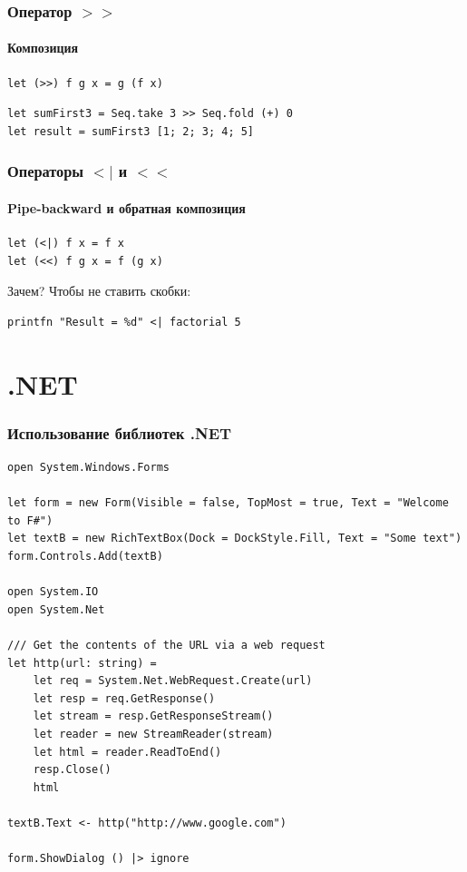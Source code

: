 \documentclass[xetex,mathserif,serif]{beamer}
\begin{document}
	\begin{frame}[fragile]
		\frametitle{Оператор $>>$}
		\framesubtitle{Композиция}
		\begin{verbatim}
let (>>) f g x = g (f x)
		\end{verbatim}
		\begin{verbatim}
let sumFirst3 = Seq.take 3 >> Seq.fold (+) 0
let result = sumFirst3 [1; 2; 3; 4; 5]
		\end{verbatim}
	\end{frame}

	\begin{frame}[fragile]
		\frametitle{Операторы $<|$ и $<<$}
		\framesubtitle{Pipe-backward и обратная композиция}
		\begin{verbatim}
let (<|) f x = f x
let (<<) f g x = f (g x)
		\end{verbatim}
		Зачем? Чтобы не ставить скобки:
		\begin{verbatim}
printfn "Result = %d" <| factorial 5
		\end{verbatim}
	\end{frame}

	\section{.NET}

	\begin{frame}[fragile]
		\frametitle{Использование библиотек .NET}
		\begin{scriptsize}
			\begin{verbatim}
open System.Windows.Forms

let form = new Form(Visible = false, TopMost = true, Text = "Welcome to F#")
let textB = new RichTextBox(Dock = DockStyle.Fill, Text = "Some text")
form.Controls.Add(textB)

open System.IO
open System.Net

/// Get the contents of the URL via a web request
let http(url: string) =
    let req = System.Net.WebRequest.Create(url)
    let resp = req.GetResponse()
    let stream = resp.GetResponseStream()
    let reader = new StreamReader(stream)
    let html = reader.ReadToEnd()
    resp.Close()
    html

textB.Text <- http("http://www.google.com")

form.ShowDialog () |> ignore
			\end{verbatim}
		\end{scriptsize}
	\end{frame}
\end{document}
